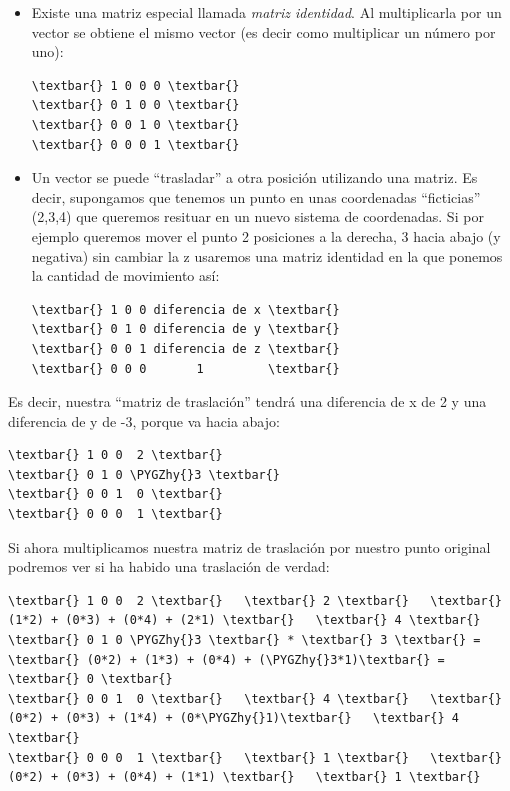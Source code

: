 \documentclass[a4paper,12pt,spanish]{sphinxmanual}
\def\PYGZhy{\char`\-}
\begin{document}
\begin{itemize}
\item {} 
Existe una matriz especial llamada \emph{matriz identidad}. Al multiplicarla por un vector se obtiene el mismo vector (es decir como multiplicar un número por uno):

\begin{Verbatim}[commandchars=\\\{\}]
\textbar{} 1 0 0 0 \textbar{}
\textbar{} 0 1 0 0 \textbar{}
\textbar{} 0 0 1 0 \textbar{}
\textbar{} 0 0 0 1 \textbar{}
\end{Verbatim}

\item {} 
Un vector se puede ``trasladar'' a otra posición utilizando una matriz. Es decir, supongamos que tenemos un punto en unas coordenadas ``ficticias'' (2,3,4) que queremos resituar en un nuevo sistema de coordenadas. Si por ejemplo queremos mover el punto 2 posiciones a la derecha, 3 hacia abajo (y negativa) sin cambiar la z usaremos una matriz identidad en la que ponemos la cantidad de movimiento así:

\begin{Verbatim}[commandchars=\\\{\}]
\textbar{} 1 0 0 diferencia de x \textbar{}
\textbar{} 0 1 0 diferencia de y \textbar{}
\textbar{} 0 0 1 diferencia de z \textbar{}
\textbar{} 0 0 0       1         \textbar{}
\end{Verbatim}

\end{itemize}

Es decir, nuestra ``matriz de traslación'' tendrá una diferencia de x de 2 y una diferencia de y de -3, porque  va hacia abajo:

\begin{Verbatim}[commandchars=\\\{\}]
\textbar{} 1 0 0  2 \textbar{}
\textbar{} 0 1 0 \PYGZhy{}3 \textbar{}
\textbar{} 0 0 1  0 \textbar{}
\textbar{} 0 0 0  1 \textbar{}
\end{Verbatim}

Si ahora multiplicamos nuestra matriz de traslación por nuestro punto original podremos ver si ha habido una traslación de verdad:

\begin{Verbatim}[commandchars=\\\{\}]
\textbar{} 1 0 0  2 \textbar{}   \textbar{} 2 \textbar{}   \textbar{} (1*2) + (0*3) + (0*4) + (2*1) \textbar{}   \textbar{} 4 \textbar{}
\textbar{} 0 1 0 \PYGZhy{}3 \textbar{} * \textbar{} 3 \textbar{} = \textbar{} (0*2) + (1*3) + (0*4) + (\PYGZhy{}3*1)\textbar{} = \textbar{} 0 \textbar{}
\textbar{} 0 0 1  0 \textbar{}   \textbar{} 4 \textbar{}   \textbar{} (0*2) + (0*3) + (1*4) + (0*\PYGZhy{}1)\textbar{}   \textbar{} 4 \textbar{}
\textbar{} 0 0 0  1 \textbar{}   \textbar{} 1 \textbar{}   \textbar{} (0*2) + (0*3) + (0*4) + (1*1) \textbar{}   \textbar{} 1 \textbar{}
\end{Verbatim}
\end{document}
